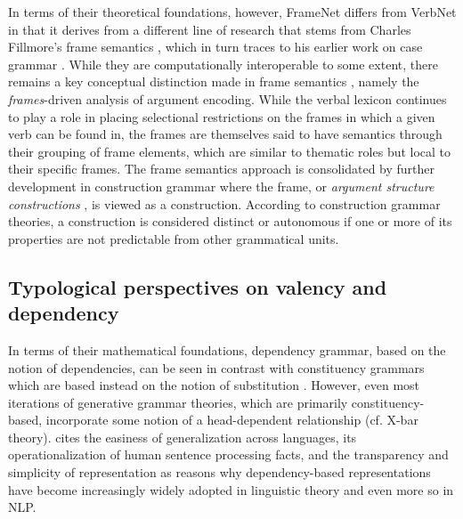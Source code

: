 In terms of their theoretical foundations, however, FrameNet differs from VerbNet in that it derives from a different line of research that stems from Charles Fillmore's frame semantics \citep{fillmore1977, fillmore1977a, fillmore1982}, which in turn traces to his earlier work on case grammar \citep{fillmore1968,fillmore1970}. While they are computationally interoperable to some extent, there remains a key conceptual distinction made in frame semantics \citet{fillmore1968}, namely the \textit{frames}-driven analysis of argument encoding. While the verbal lexicon continues to play a role in placing selectional restrictions on the frames in which a given verb can be found in, the frames are themselves said to have semantics through their grouping of frame elements, which are similar to thematic roles but local to their specific frames. The frame semantics approach is consolidated by further development in construction grammar where the frame, or \textit{argument structure constructions} \citep{goldberg1992,goldberg1995}, is viewed as a construction. According to construction grammar theories, a construction is considered distinct or autonomous if one or more of its properties are not predictable from other grammatical units. 


\subsection{Typological perspectives on valency and dependency}\label{subsec:typology}

In terms of their mathematical foundations, dependency grammar, based on the notion of dependencies, can be seen in contrast with constituency grammars which are based instead on the notion of substitution \citep{stabler2019}. However, even most iterations of generative grammar theories, which are primarily constituency-based, incorporate some notion of a head-dependent relationship (cf. X-bar theory). \citet{demarneffe2019} cites the easiness of generalization across languages, its operationalization of human sentence processing facts, and the transparency and simplicity of representation as reasons why dependency-based representations have become increasingly widely adopted in linguistic theory and even more so in NLP. 

